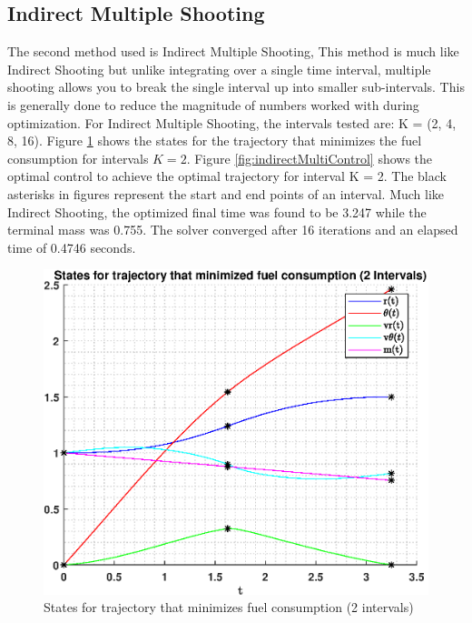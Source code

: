 \documentclass[]{article}
\begin{document}
\subsection{Indirect Multiple Shooting}
The second method used is Indirect Multiple Shooting, This method is much like Indirect Shooting but unlike integrating over a single time interval, multiple shooting allows you to break the single interval up into smaller sub-intervals. This is generally done to reduce the magnitude of numbers worked with during optimization. For Indirect Multiple Shooting, the intervals tested are: K = (2, 4, 8, 16).
\vspace{2mm}\newline
Figure \ref{fig:indirectMultiStates} shows the states for the trajectory that minimizes the fuel consumption for intervals \(K = 2\). Figure \ref{fig:indirectMultiControl} shows the optimal control to achieve the optimal trajectory for interval K = 2. The black asterisks in figures represent the start and end points of an interval. Much like Indirect Shooting, the optimized final time was found to be 3.247 while the terminal mass was 0.755. The solver converged after 16 iterations and an elapsed time of 0.4746 seconds.
\begin{figure}[hbt!]
	\centering
	\includegraphics[scale=0.75]{indirectMultiStates.eps}
	\caption{States for trajectory that minimizes fuel consumption (2 intervals)}
	\label{fig:indirectMultiStates}
\end{figure}
\end{document}
